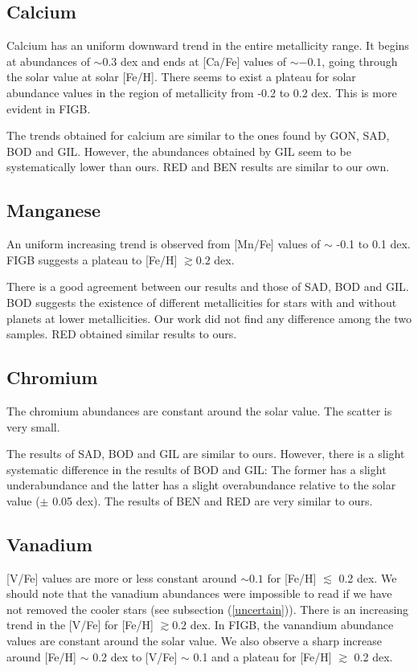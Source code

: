 \documentclass[dvips,12pt,a4paper]{report}
\begin{document}
{{\subsection{Calcium}

Calcium has an uniform downward trend in the entire metallicity range. It begins at abundances of $\sim 0.3$ dex and ends at [Ca/Fe] values of $\sim -0.1$, going through the solar value at solar [Fe/H]. There seems to exist a plateau for solar abundance values in the region of metallicity from -0.2 to 0.2 dex. This is more evident in FIGB.

The trends obtained for calcium are similar to the ones found by GON, SAD, BOD and GIL. However, the abundances obtained by GIL seem to be systematically lower than ours. RED and BEN results are similar to our own.

\subsection{Manganese}

An uniform increasing trend is observed from [Mn/Fe] values of $\sim$ -0.1 to 0.1 dex. FIGB suggests a plateau to [Fe/H] $\gtrsim 0.2$ dex. 

There is a good agreement between our results and those of SAD, BOD and GIL. BOD suggests the existence of different metallicities for stars with and without planets at lower metallicities. Our work did not find any difference among the two samples. RED obtained similar results to ours.


\subsection {Chromium}

The chromium abundances are constant around the solar value. The scatter is very small. 

The results of SAD, BOD and GIL are similar to ours. However, there is a slight systematic difference in the results of BOD and GIL: The former has a slight underabundance and the latter has a slight overabundance relative to the solar value ($\pm$ 0.05 dex). The results of BEN and RED are very similar to ours.

\subsection {Vanadium}

[V/Fe] values are more or less constant around $\sim 0.1$ for [Fe/H] $\lesssim$ 0.2 dex. We should note that the vanadium abundances were impossible to read if we have not removed the cooler stars (see subsection (\ref{uncertain})). There is an increasing trend in the [V/Fe] for [Fe/H] $\gtrsim 0.2$ dex. In FIGB, the vanandium abundance values are constant around the solar value. %
We also observe a sharp increase around [Fe/H] $\sim$ 0.2 dex to [V/Fe] $\sim$ 0.1 and a plateau for [Fe/H] $\gtrsim$ 0.2 dex. 

}}
\end{document}
